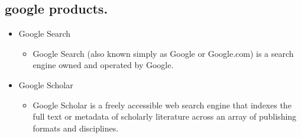 \documentclass[a4paper,11pt]{report}
\begin{document}
\subsection{google products.}

\begin{itemize}
    \item Google Search
    \begin{itemize}
        \item Google Search (also known simply as Google or Google.com) is a search engine owned and operated by Google.
    \end{itemize}
\end{itemize}


\begin{itemize}
    \item Google Scholar
    \begin{itemize}
        \item Google Scholar is a freely accessible web search engine that indexes the full text or metadata of scholarly literature across an array of publishing formats and disciplines.
    \end{itemize}
\end{itemize}
\end{document}
